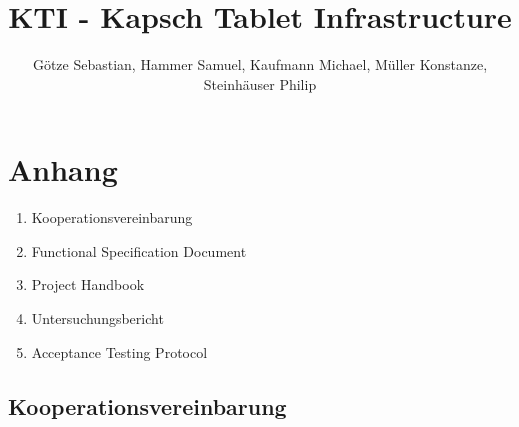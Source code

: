 \documentclass[diplom,german]{hgbthesis}
\begin{document}
\title{KTI - Kapsch Tablet Infrastructure}
\author{Götze Sebastian, Hammer Samuel, Kaufmann Michael, Müller Konstanze, Steinhäuser 				Philip}



\frontmatter


\newpage

\setcounter{tocdepth}{5}
\setcounter{secnumdepth}{5}
\tableofcontents

\mainmatter
\setcounter{page}{1}











\printbibliography[heading=bibintoc]
%
\listoffigures
{}

%
\listoftables
{}





\chapter{Anhang}
\begin{enumerate}
	\item Kooperationsvereinbarung
	\item Functional Specification Document
	\item Project Handbook
	\item Untersuchungsbericht
	\item Acceptance Testing Protocol
\end{enumerate}

\newpage

\section{Kooperationsvereinbarung}

\newpage
\end{document}
